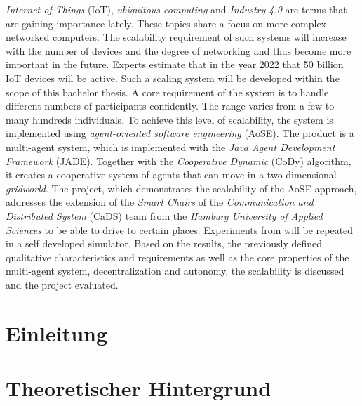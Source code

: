 \documentclass[draft=false
              ,paper=a4
              ,twoside=false
              ,fontsize=11pt
              ,headsepline
              ,BCOR=10mm
              ]{scrbook}
\begin{document}
{\textit{Internet of Things} (IoT), \textit{ubiquitous computing} and \textit{Industry 4.0} are terms that are gaining importance lately. These topics share a focus on more complex networked computers. The scalability requirement of such systems will increase with the number of devices and the degree of networking and thus become more important in the future. Experts estimate that in the year 2022 that 50 billion IoT devices will be active.\newline
Such a scaling system will be developed within the scope of this bachelor thesis. A core requirement of the system is to handle different numbers of participants confidently. The range varies from a few to many hundreds individuals. To achieve this level of scalability, the system is implemented using \textit{agent-oriented software engineering} (AoSE). The product is a multi-agent system, which is implemented with the \textit{Java Agent Development Framework} (JADE). Together with the \textit{Cooperative Dynamic} (CoDy) algorithm, it creates a cooperative system of agents that can move in a two-dimensional \textit{gridworld}.\newline
The project, which demonstrates the scalability of the AoSE approach, addresses the extension of the \textit{Smart Chairs} of the \textit{Communication and Distributed System} (CaDS) team from the \textit{Hamburg University of Applied Sciences} to be able to drive to certain places.\newline
Experiments from \cite{book:regele} will be repeated in a self developed simulator. Based on the results, the previously defined qualitative characteristics and requirements as well as the core properties of the multi-agent system, decentralization and autonomy, the scalability is discussed and the project evaluated.}

\newpage
\singlespacing

\setcounter{tocdepth}{3}
\tableofcontents
\newpage
\listoftables
\listoffigures
\lstlistoflistings

\mainmatter
\onehalfspacing

\chapter{Einleitung}

\label{chap:einleitung}
%
\chapter{Theoretischer Hintergrund}
\label{chap:theorie}

%
\end{document}
